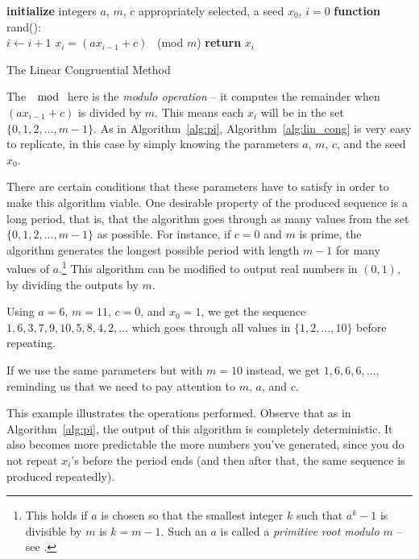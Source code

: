 \begin{algorithm}
\textbf{initialize} integers $a$, $m$, $c$ appropriately selected, a seed $x_0$, $i = 0$ \;
\textbf{function} rand(): \\
\qquad $i \leftarrow i + 1$ \;
\qquad $x_{i} = (ax_{i-1} + c)$ \ (mod $m$) \;
\qquad	\textbf{return} $x_i$ \;
\caption{The Linear Congruential Method}
\label{alg:lin_cong}
\end{algorithm}


The $\mod$ here is the \emph{modulo operation} -- it computes the remainder when $(ax_{i-1} + c)$ is divided by $m$.
This means each $x_i$ will be in the set $\{0,1,2,\ldots,m-1\}$.
As in Algorithm~\ref{alg:pi}, Algorithm~\ref{alg:lin_cong} is very easy to replicate, in this case by simply knowing the parameters $a$, $m$, $c$, and the seed $x_0$.

There are certain conditions that these parameters have to satisfy in order to make this algorithm viable.
One desirable property of the produced sequence is a long period, that is, that the algorithm goes through as many values from the set $\{0,1,2,\ldots,m-1\}$ as possible.
For instance, if $c = 0$ and $m$ is prime, the algorithm generates the longest possible period with length $m - 1$ for many values of $a$.\footnote{This holds if $a$ is chosen so that the smallest integer $k$ such that $a^k - 1$ is divisible by $m$ is $k = m - 1$. Such an $a$ is called a \emph{primitive root modulo $m$} -- see \cite{law2015}.}
This algorithm can be modified to output real numbers in $(0,1)$, by dividing the outputs by $m$. 

\begin{myexample} 

	Using $a = 6$, $m = 11$, $c = 0$, and $x_0 = 1$, we get the sequence $1, 6, 3, 7, 9, 10, 5, 8, 4, 2,  \ldots$ which goes through all values in $\{1, 2, \ldots, 10\}$ before repeating.

	If we use the same parameters but with $m = 10$ instead, we get $1, 6, 6, 6, \ldots$, reminding us that we need to pay attention to $m$, $a$, and $c$.
\end{myexample}

This example illustrates the operations performed.
Observe that as in Algorithm~\ref{alg:pi}, the output of this algorithm is completely deterministic.
It also becomes more predictable the more numbers you've generated, since you do not repeat $x_i$'s before the period ends (and then after that, the same sequence is produced repeatedly).

